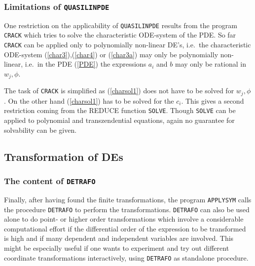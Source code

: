 \subsubsection{Limitations of {\tt QUASILINPDE}}
One restriction on the applicability of {\tt QUASILINPDE} results from
the program {\tt CRACK} which tries to solve the
characteristic ODE-system of the PDE. So far {\tt CRACK} can be
applied only to polynomially non-linear DE's, i.e.\ the characteristic 
ODE-system (\ref{char3}),(\ref{char4}) or (\ref{char3a}) may
only be polynomially non-linear, i.e.\ in the PDE (\ref{PDE})
the expressions $a_i$ and $b$ may only be rational in $w_j,\phi$.

The task of {\tt CRACK} is simplified as (\ref{charsol1}) does not have to
be solved for $w_j, \phi$. On the other hand (\ref{charsol1}) has to be
solved for the $c_i$. This gives a 
second restriction coming from the REDUCE function {\tt SOLVE}.
Though {\tt SOLVE} can be applied
to polynomial and transzendential equations, again no guarantee for
solvability can be given.
\subsection{Transformation of DEs}
\subsubsection{The content of {\tt DETRAFO}}
Finally, after having found the finite transformations,
the program {\tt APPLYSYM} calls the procedure
{\tt DETRAFO} to perform the transformations. {\tt DETRAFO}
can also be used alone to do point- or higher order transformations
which involve a considerable computational effort if the
differential order of the expression to be transformed is high and
if many dependent and independent variables are involved.
This might be especially useful if one wants to experiment
and try out different coordinate transformations interactively,
using {\tt DETRAFO} as standalone procedure.


